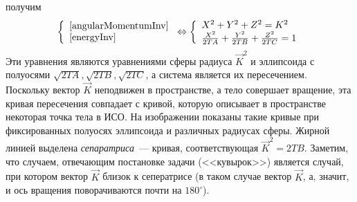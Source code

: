 \documentclass{article}
\newcommand{\degree}{^{\circ}}
\begin{document}
получим
\begin{equation}
\left\{
\begin{array}{l}
\ref{angularMomentumInv}\\
\ref{energyInv}
\end{array}
\right.
\Leftrightarrow
\left\{
\begin{array}{l}
X^2+Y^2+Z^2=K^2\\
\frac{X^2}{2TA}+\frac{Y^2}{2TB}+\frac{Z^2}{2TC}=1
\end{array}
\right.
\end{equation}
Эти уравнения являются уравнениями сферы радиуса \begin{math} \vec{K}^2 \end{math} и эллипсоида с полуосями \begin{math} \sqrt{2TA}, \sqrt{2TB}, \sqrt{2TC} \end{math}, а система является их пересечением. Поскольку вектор \begin{math} \vec{K} \end{math} неподвижен в пространстве, а тело совершает вращение, эта кривая пересечения совпадает с кривой, которую описывает в пространстве некоторая точка тела в ИСО.\newline
На изображении показаны такие кривые при фиксированных полуосях эллипсоида и различных радиусах сферы. Жирной линией выделена {\em сепаратриса}~--- кривая, соответствующая \begin{math} \vec{K}^2=2TB \end{math}. Заметим, что случаем, отвечающим постановке задачи (<<кувырок>>) является случай, при котором вектор \begin{math} \vec{K} \end{math} близок к сеператрисе (в таком случае вектор \begin{math} \vec{K} \end{math}, а, значит, и ось вращения поворачиваются почти на \begin{math} 180\degree \end{math}).
\end{document}
